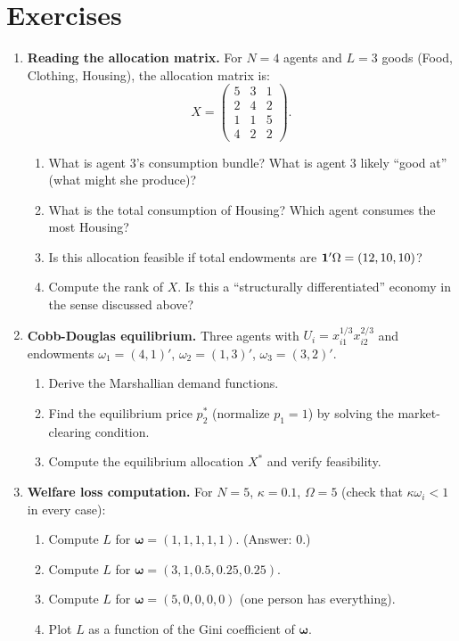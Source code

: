 \documentclass[../structural_economics_book.tex]{subfiles}
\begin{document}
\section{Exercises}
\label{ch01:sec:exercises}

\begin{enumerate}[label=\textbf{1.\arabic*}, leftmargin=3em]

\item \textbf{Reading the allocation matrix.} For $N = 4$ agents and $L = 3$ goods (Food, Clothing, Housing), the allocation matrix is:
\begin{equation}
X = \begin{pmatrix} 5 & 3 & 1 \\ 2 & 4 & 2 \\ 1 & 1 & 5 \\ 4 & 2 & 2 \end{pmatrix}.
\end{equation}
\begin{enumerate}
\item What is agent 3's consumption bundle? What is agent 3 likely ``good at'' (what might she produce)?
\item What is the total consumption of Housing? Which agent consumes the most Housing?
\item Is this allocation feasible if total endowments are $\mathbf{1}'\Omega = (12, 10, 10)$?
\item Compute the rank of $X$. Is this a ``structurally differentiated'' economy in the sense discussed above?
\end{enumerate}

\item \textbf{Cobb-Douglas equilibrium.} Three agents with $U_i = x_{i1}^{1/3}x_{i2}^{2/3}$ and endowments $\omega_1 = (4, 1)'$, $\omega_2 = (1, 3)'$, $\omega_3 = (3, 2)'$.
\begin{enumerate}
\item Derive the Marshallian demand functions.
\item Find the equilibrium price $p_2^*$ (normalize $p_1 = 1$) by solving the market-clearing condition.
\item Compute the equilibrium allocation $X^*$ and verify feasibility.
\end{enumerate}

\item \textbf{Welfare loss computation.} For $N = 5$, $\kappa = 0.1$, $\Omega = 5$ (check that $\kappa\omega_i < 1$ in every case):
\begin{enumerate}
\item Compute $L$ for $\boldsymbol{\omega} = (1, 1, 1, 1, 1)$. (Answer: 0.)
\item Compute $L$ for $\boldsymbol{\omega} = (3, 1, 0.5, 0.25, 0.25)$.
\item Compute $L$ for $\boldsymbol{\omega} = (5, 0, 0, 0, 0)$ (one person has everything).
\item Plot $L$ as a function of the Gini coefficient of $\boldsymbol{\omega}$.
\end{enumerate}


\end{enumerate}
\end{document}
